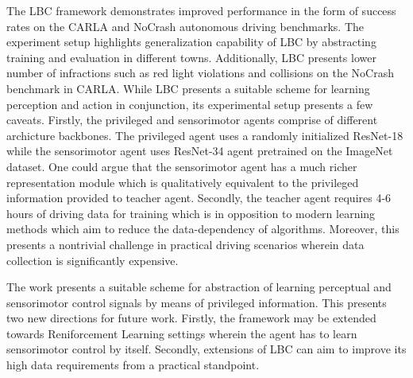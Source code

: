 \documentclass[11pt,letterpaper]{article}
\begin{document}
The LBC framework demonstrates improved performance in the form of success rates on the CARLA and NoCrash autonomous driving benchmarks. The experiment setup highlights generalization capability of LBC by abstracting training and evaluation in different towns. Additionally, LBC presents lower number of infractions such as red light violations and collisions on the NoCrash benchmark in CARLA. While LBC presents a suitable scheme for learning perception and action in conjunction, its experimental setup presents a few caveats. Firstly, the privileged and sensorimotor agents comprise of different archicture backbones. The privileged agent uses a randomly initialized ResNet-18 while the sensorimotor agent uses ResNet-34 agent pretrained on the ImageNet dataset. One could argue that the sensorimotor agent has a much richer representation module which is qualitatively equivalent to the privileged information provided to teacher agent. Secondly, the teacher agent requires 4-6 hours of driving data for training which is in opposition to modern learning methods which aim to reduce the data-dependency of algorithms. Moreover, this presents a nontrivial challenge in practical driving scenarios wherein data collection is significantly expensive. 

The work presents a suitable scheme for abstraction of learning perceptual and sensorimotor control signals by means of privileged information. This presents two new directions for future work. Firstly, the framework may be extended towards Reniforcement Learning settings wherein the agent has to learn sensorimotor control by itself. Secondly, extensions of LBC can aim to improve its high data requirements from a practical standpoint. 
\end{document}
